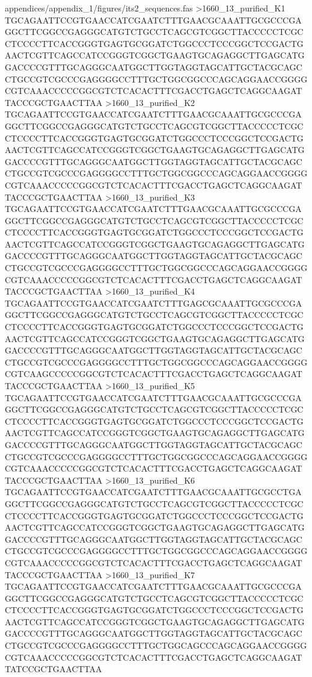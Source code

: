 {\begin{filecontents*}{appendices/appendix_1/figures/its2_sequences.fas}
>1660_13_purified_K1
TGCAGAATTCCGTGAACCATCGAATCTTTGAACGCAAATTGCGCCCGAGGCTTCGGCCGAGGGCATGTCTGCCTCAGCGTCGGCTTACCCCCTCGCCTCCCCTTCACCGGGTGAGTGCGGATCTGGCCCTCCCGGCTCCGACTGAACTCGTTCAGCCATCCGGGTCGGCTGAAGTGCAGAGGCTTGAGCATGGACCCCGTTTGCAGGGCAATGGCTTGGTAGGTAGCATTGCTACGCAGCCTGCCGTCGCCCGAGGGGCCTTTGCTGGCGGCCCAGCAGGAACCGGGGCGTCAAACCCCCGGCGTCTCACACTTTCGACCTGAGCTCAGGCAAGATTACCCGCTGAACTTAA
>1660_13_purified_K2
TGCAGAATTCCGTGAACCATCGAATCTTTGAACGCAAATTGCGCCCGAGGCTTCGGCCGAGGGCATGTCTGCCTCAGCGTCGGCTTACCCCCTCGCCTCCCCTTCACCGGGTGAGTGCGGATCTGGCCCTCCCGGCTCCGACTGAACTCGTTCAGCCATCCGGGTCGGCTGAAGTGCAGAGGCTTGAGCATGGACCCCGTTTGCAGGGCAATGGCTTGGTAGGTAGCATTGCTACGCAGCCTGCCGTCGCCCGAGGGGCCTTTGCTGGCGGCCCAGCAGGAACCGGGGCGTCAAACCCCCGGCGTCTCACACTTTCGACCTGAGCTCAGGCAAGATTACCCGCTGAACTTAA
>1660_13_purified_K3
TGCAGAATTCCGTGAACCATCGAATCTTTGAACGCAAATTGCGCCCGAGGCTTCGGCCGAGGGCATGTCTGCCTCAGCGTCGGCTTACCCCCTCGCCTCCCCTTCACCGGGTGAGTGCGGATCTGGCCCTCCCGGCTCCGACTGAACTCGTTCAGCCATCCGGGTCGGCTGAAGTGCAGAGGCTTGAGCATGGACCCCGTTTGCAGGGCAATGGCTTGGTAGGTAGCATTGCTACGCAGCCTGCCGTCGCCCGAGGGGCCTTTGCTGGCGGCCCAGCAGGAACCGGGGCGTCAAACCCCCGGCGTCTCACACTTTCGACCTGAGCTCAGGCAAGATTACCCGCTGAACTTAA
>1660_13_purified_K4
TGCAGAATTCCGTGAACCATCGAATCTTTGAGCGCAAATTGCGCCCGAGGCTTCGGCCGAGGGCATGTCTGCCTCAGCGTCGGCTTACCCCCTCGCCTCCCCTTCACCGGGTGAGTGCGGATCTGGCCCTCCCGGCTCCGACTGAACTCGTTCAGCCATCCGGGTCGGCTGAAGTGCAGAGGCTTGAGCATGGACCCCGTTTGCAGGGCAATGGCTTGGTAGGTAGCATTGCTACGCAGCCTGCCGTCGCCCGAGGGGCCTTTGCTGGCGGCCCAGCAGGAACCGGGGCGTCAAGCCCCCGGCGTCTCACACTTTCGACCTGAGCTCAGGCAAGATTACCCGCTGAACTTAA
>1660_13_purified_K5
TGCAGAATTCCGTGAACCATCGAATCTTTGAACGCAAATTGCGCCCGAGGCTTCGGCCGAGGGCATGTCTGCCTCAGCGTCGGCTTACCCCCTCGCCTCCCCTTCACCGGGTGAGTGCGGATCTGGCCCTCCCGGCTCCGACTGAACTCGTTCAGCCATCCGGGTCGGCTGAAGTGCAGAGGCTTGAGCATGGACCCCGTTTGCAGGGCAATGGCTTGGTAGGTAGCATTGCTACGCAGCCTGCCGTCGCCCGAGGGGCCTTTGCTGGCGGCCCAGCAGGAACCGGGGCGTCAAACCCCCGGCGTCTCACACTTTCGACCTGAGCTCAGGCAAGATTACCCGCTGAACTTAA
>1660_13_purified_K6
TGCAGAATTCCGTGAACCATCGAATCTTTGAACGCAAATTGCGCCTGAGGCTTCGGCCGAGGGCATGTCTGCCTCAGCGTCGGCTTACCCCCTCGCCTCCCCTTCACCGGGTGAGTGCGGATCTGGCCCTCCCGGCTCCGACTGAACTCGTTCAGCCATCCGGGTCGGCTGAAGTGCAGAGGCTTGAGCATGGACCCCGTTTGCAGGGCAATGGCTTGGTAGGTAGCATTGCTACGCAGCCTGCCGTCGCCCGAGGGGCCTTTGCTGGCGGCCCAGCAGGAACCGGGGCGTCAAACCCCCGGCGTCTCACACTTTCGACCTGAGCTCAGGCAAGATTACCCGCTGAACTTAA
>1660_13_purified_K7
TGCAGAATTCCGTGAACCATCGAATCTTTGAACGCAAATTGCGCCCGAGGCTTCGGCCGAGGGCATGTCTGCCTCAGCGTCGGCTTACCCCCTCGCCTCCCCTTCACCGGGTGAGTGCGGATCTGGCCCTCCCGGCTCCGACTGAACTCGTTCAGCCATCCGGGTCGGCTGAAGTGCAGAGGCTTGAGCATGGACCCCGTTTGCAGGGCAATGGCTTGGTAGGTAGCATTGCTACGCAGCCTGCCGTCGCCCGAGGGGCCTTTGCTGGCAGCCCAGCAGGAACCGGGGCGTCAAACCCCCGGCGTCTCACACTTTCGACCTGAGCTCAGGCAAGATTATCCGCTGAACTTAA

\end{filecontents*}}
